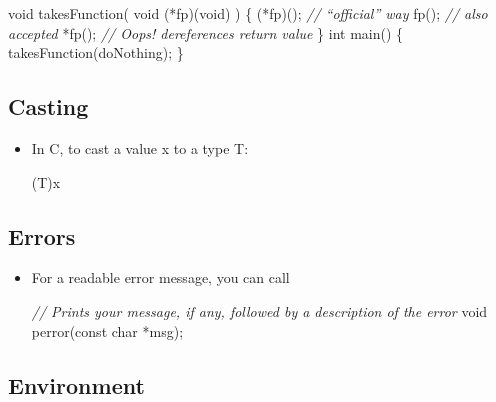 \documentclass[]{article}
\newenvironment{Shaded}{}{}
\newcommand{\DataTypeTok}[1]{\textcolor[rgb]{0.56,0.13,0.00}{#1}}
\newcommand{\CommentTok}[1]{\textcolor[rgb]{0.38,0.63,0.69}{\textit{#1}}}
\newcommand{\NormalTok}[1]{#1}
\begin{document}
\begin{itemize}
\begin{Shaded}
\begin{Highlighting}[]
\DataTypeTok{void}\NormalTok{ takesFunction( }\DataTypeTok{void}\NormalTok{ (*fp)(}\DataTypeTok{void}\NormalTok{) ) \{}
\NormalTok{    (*fp)(); 	}\CommentTok{// “official” way}
\NormalTok{    fp();     	}\CommentTok{// also accepted}
\NormalTok{    *fp();		}\CommentTok{// Oops! dereferences return value}
\NormalTok{\}}
\DataTypeTok{int}\NormalTok{ main() \{}
\NormalTok{	takesFunction(doNothing);}
\NormalTok{\}}
\end{Highlighting}
\end{Shaded}
\end{itemize}

\subsection{\texorpdfstring{\textbf{Casting}}{Casting}}\label{header-n56}

\begin{itemize}
\item
  In C, to cast a value x to a type T:

\begin{Shaded}
\begin{Highlighting}[]
\NormalTok{(T)x}
\end{Highlighting}
\end{Shaded}
\end{itemize}

\subsection{\texorpdfstring{\textbf{Errors}}{Errors}}\label{header-n62}

\begin{itemize}
\item
  For a readable error message, you can call

\begin{Shaded}
\begin{Highlighting}[]
\CommentTok{// Prints your message, if any, followed by a description of the error}
\DataTypeTok{void}\NormalTok{ perror(}\DataTypeTok{const} \DataTypeTok{char}\NormalTok{ *msg); }
\end{Highlighting}
\end{Shaded}
\end{itemize}

\subsection{\texorpdfstring{\textbf{Environment}}{Environment}}\label{header-n68}
\end{document}
